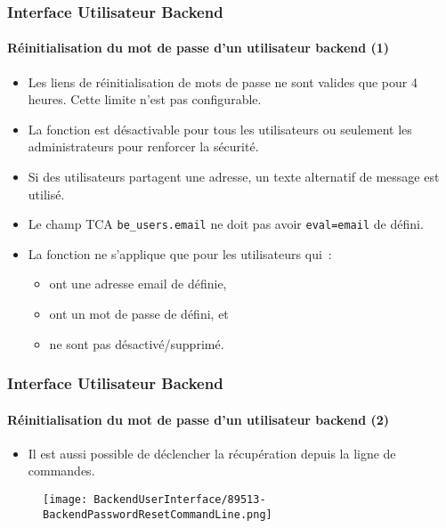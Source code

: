 
\begin{frame}[fragile]
	\frametitle{Interface Utilisateur Backend}
	\framesubtitle{Réinitialisation du mot de passe d'un utilisateur backend (1)}

	\begin{itemize}

		\item Les liens de réinitialisation de mots de passe ne sont valides que pour 4 heures.\newline
		Cette limite n'est pas configurable.
		\item La fonction est désactivable pour tous les utilisateurs ou seulement les administrateurs pour renforcer la sécurité.
		\item Si des utilisateurs partagent une adresse, un texte alternatif de message est utilisé.
		\item Le champ TCA \texttt{be\_users.email} ne doit pas avoir \texttt{eval=email} de défini.

		\item La fonction ne s'applique que pour les utilisateurs qui~:
			\begin{itemize}
				\item ont une adresse email de définie,
				\item ont un mot de passe de défini, et
				\item ne sont pas désactivé/supprimé.
			\end{itemize}

	\end{itemize}

\end{frame}


\begin{frame}[fragile]
	\frametitle{Interface Utilisateur Backend}
	\framesubtitle{Réinitialisation du mot de passe d'un utilisateur backend (2)}

	\begin{itemize}
		\item Il est aussi possible de déclencher la récupération depuis la ligne de commandes.
	\end{itemize}

	\begin{figure}
		\texttt{[image: BackendUserInterface/89513-BackendPasswordResetCommandLine.png]}
	\end{figure}

\end{frame}

